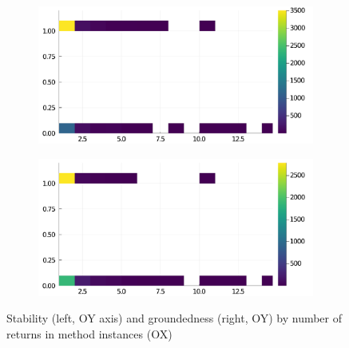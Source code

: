 \begin{figure}[h]
     \begin{subfigure}[b]{0.49\textwidth}
       \includegraphics[width=\textwidth]{figs/all-package-graphs/Plots-returns-vs-stable.pdf}
     \end{subfigure}
     \begin{subfigure}[b]{0.49\textwidth}
       \includegraphics[width=\textwidth]{figs/all-package-graphs/Plots-returns-vs-grounded.pdf}
     \end{subfigure}
\caption{Stability (left, OY axis) and groundedness (right, OY) by number of returns in method instances (OX)}%
%
\label{figs:returns:Plots}
\end{figure}
\clearpage
